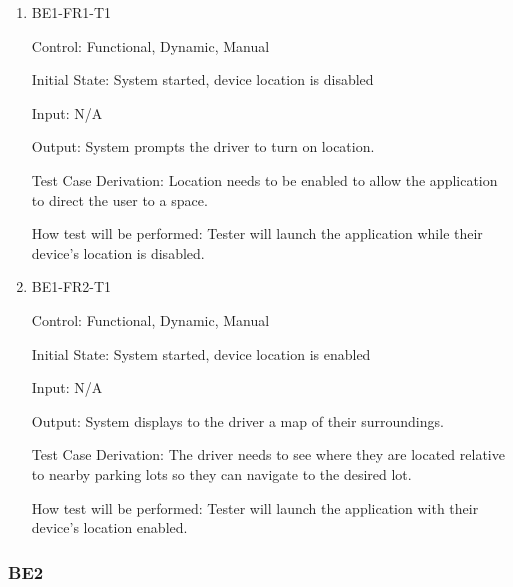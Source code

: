 \documentclass[12pt, titlepage]{article}
\begin{document}
\begin{enumerate}

\item{BE1-FR1-T1}

Control: Functional, Dynamic, Manual
					
Initial State: System started, device location is disabled
					
Input: N/A
					
Output: System prompts the driver to turn on location.

Test Case Derivation: Location needs to be enabled to allow the application to
direct the user to a space.
					
How test will be performed: Tester will launch the application while their
device's location is disabled.
					
\item{BE1-FR2-T1}

Control: Functional, Dynamic, Manual
					
Initial State: System started, device location is enabled
					
Input: N/A
					
Output: System displays to the driver a map of their surroundings.

Test Case Derivation: The driver needs to see where they are located relative to
nearby parking lots so they can navigate to the desired lot.

How test will be performed: Tester will launch the application with their
device's location enabled.

\end{enumerate}

\subsubsection{BE2}
\end{document}
